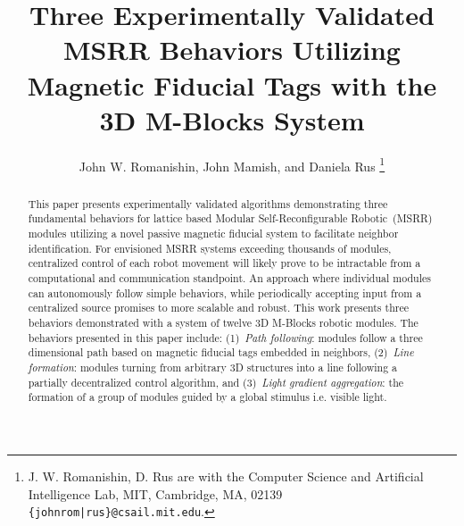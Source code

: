 \documentclass[letterpaper, 10 pt, conference]{ieeeconf}
\title{Three Experimentally Validated MSRR Behaviors Utilizing Magnetic Fiducial Tags with the 3D M-Blocks System}
\author{John W. Romanishin, John Mamish, and Daniela Rus
  \thanks{J. W. Romanishin, D. Rus are with the Computer Science
    and Artificial Intelligence Lab, MIT, Cambridge, MA, 02139
    {\tt\small \{johnrom|rus\}@csail.mit.edu}.}
}
\begin{document}
	
\newcommand{\tagName}{MFTag}
\newcommand{\TagName}{MFTag}
\newcommand{\tagNamePlural}{MFTags}
\newcommand{\TagNamePlural}{MFTags}


\captionsetup[figure]{labelfont=small, textfont=small}
\captionsetup[table]{labelfont=small, textfont=small}

\maketitle
\thispagestyle{empty}
\pagestyle{empty}

\begin{abstract}

This paper presents experimentally validated algorithms demonstrating three fundamental behaviors for lattice based Modular Self-Reconfigurable Robotic~(MSRR) modules utilizing a novel passive magnetic fiducial system to facilitate neighbor identification. For envisioned MSRR systems exceeding thousands of modules, centralized control of each robot movement will likely prove to be intractable from a computational and communication standpoint. An approach where individual modules can autonomously follow simple behaviors, while periodically accepting input from a centralized source promises to more scalable and robust. This work presents three behaviors demonstrated with a system of twelve 3D M-Blocks robotic modules. The behaviors presented in this paper include: (1)~\textit{Path following}: modules follow a three dimensional path based on magnetic fiducial tags embedded in neighbors, (2)~\textit{Line formation}: modules turning from arbitrary 3D structures into a line following a partially decentralized control algorithm, and (3)~\textit{Light gradient aggregation}: the formation of a group of modules guided by a global stimulus i.e. visible light.

\end{abstract}


\end{document}
